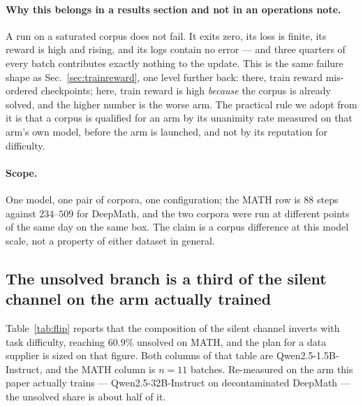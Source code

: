 \paragraph{Why this belongs in a results section and not in an operations note.} A run on a
saturated corpus does not fail. It exits zero, its loss is finite, its reward is high and
rising, and its logs contain no error --- and three quarters of every batch contributes
exactly nothing to the update. This is the same failure shape as Sec.~\ref{sec:trainreward},
one level further back: there, train reward mis-ordered checkpoints; here, train reward is
high \emph{because} the corpus is already solved, and the higher number is the worse arm. The
practical rule we adopt from it is that a corpus is qualified for an arm by its unanimity rate
measured on that arm's own model, before the arm is launched, and not by its reputation for
difficulty.

\paragraph{Scope.} One model, one pair of corpora, one configuration; the MATH row is $88$
steps against $234$--$509$ for DeepMath, and the two corpora were run at different points of
the same day on the same box. The claim is a corpus difference at this model scale, not a
property of either dataset in general.

\subsection{The unsolved branch is a third of the silent channel on the arm actually trained}
\label{sec:supplyshare}

Table~\ref{tab:flip} reports that the composition of the silent channel inverts with task
difficulty, reaching $60.9\%$ unsolved on MATH, and the plan for a data supplier is sized on
that figure. Both columns of that table are Qwen2.5-1.5B-Instruct, and the MATH column is
$n=11$ batches. Re-measured on the arm this paper actually trains --- Qwen2.5-32B-Instruct on
decontaminated DeepMath --- the unsolved share is about half of it.


